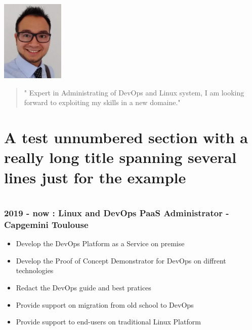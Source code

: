 \documentclass[10pt,A4]{article}
\begin{document}
\includegraphics[width=30mm]{myphoto}
\begin{quotation}
" Expert in Administrating of DevOps and Linux system, I am looking forward to exploiting my skills in a new domaine."
\end{quotation}

\begin{minipage}[c]{0.7\textwidth}

\section*{A test unnumbered section with a really long title spanning several lines just for the example}

\section*{\noindent\colorbox{cyan!20}{}}

\subsubsection*{2019 - now : Linux and DevOps PaaS Administrator - Capgemini Toulouse}
\begin{itemize}
  \item Develop the DevOps Platform as a Service on premise
  \item Develop the Proof of Concept Demonstrator for DevOps on diffrent technologies    
  \item Redact the DevOps guide and best pratices
  \item Provide support on migration from old school to DevOps
  \item Provide support to end-users on traditional Linux Platform
\end{itemize}


\end{minipage}
\end{document}
